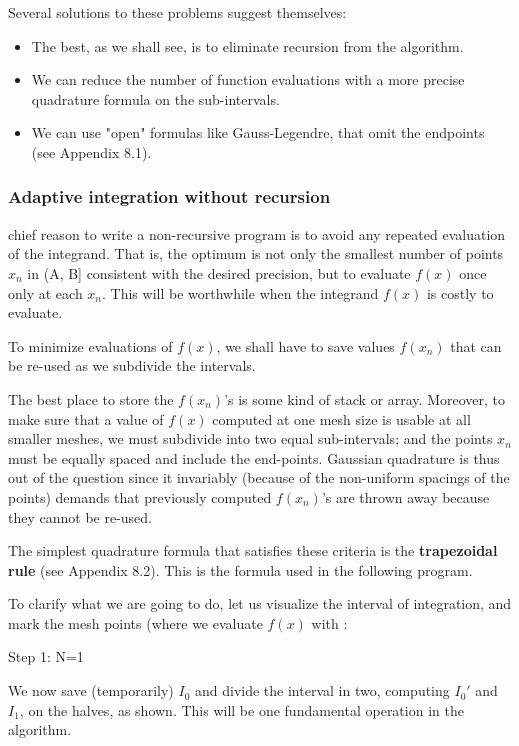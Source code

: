 Several solutions to these problems suggest themselves:
\begin{itemize}
    \item The best, as we shall see, is to eliminate recursion from the algorithm.
    \item We can reduce the number of function evaluations with a more precise quadrature formula on the sub-intervals.
    \item We can use "open" formulas like Gauss-Legendre, that omit the endpoints (see Appendix 8.1).
\end{itemize}

\subsubsection{Adaptive integration without recursion}
 chief reason to write a non-recursive program is to avoid any repeated evaluation of the integrand. That is, the optimum is not only the smallest number of points $x_n$ in (A, B] consistent with the desired precision, but to evaluate $f(x)$ once only at each $x_n$. This will be worthwhile when the integrand $f(x)$ is costly to evaluate.

To minimize evaluations of $f(x)$, we shall have to save values $f(x_n)$ that can be re-used as we subdivide the intervals.

The best place to store the $f(x_n)$’s is some kind of stack or array. Moreover, to make sure that a value of $f(x)$ computed at one mesh size is usable at all smaller meshes, we must subdivide into two equal sub-intervals; and the points $x_n$ must be equally spaced and include the end-points. Gaussian quadrature is thus out of the question since it invariably (because of the non-uniform spacings of the points) demands that previously computed $f(x_n)$'s are thrown away because they cannot be re-used.

The simplest quadrature formula that satisfies these criteria is the \textbf{trapezoidal rule} (see Appendix 8.2). This is the formula used in the following program.

To clarify what we are going to do, let us visualize the interval of integration, and mark the mesh points (where we evaluate $f(x)$ with \bc{+}:

Step 1: N=1


We now save (temporarily) $I_0$ and divide the interval in two, computing $I_{0}'$ and $I_1$, on the halves, as shown. This will be one fundamental operation in the algorithm.

